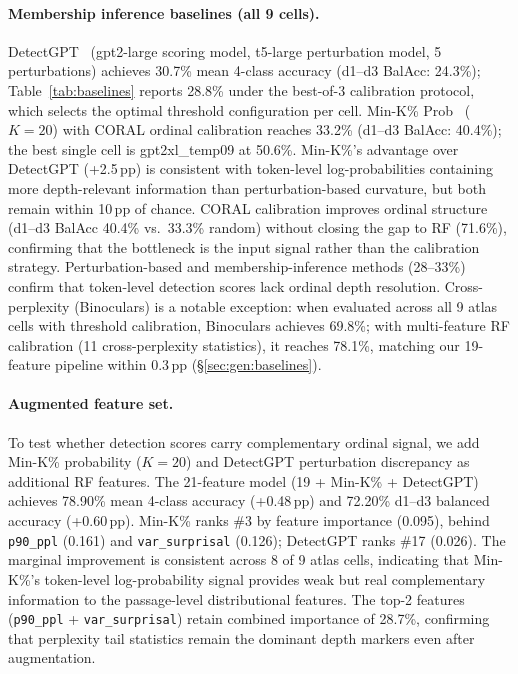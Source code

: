 \paragraph{Membership inference baselines (all 9 cells).}
DetectGPT~\cite{mitchell2023_detectgpt} (gpt2-large scoring model, t5-large perturbation model, 5 perturbations) achieves 30.7\% mean 4-class accuracy (d1--d3 BalAcc: 24.3\%); Table~\ref{tab:baselines} reports 28.8\% under the best-of-3 calibration protocol, which selects the optimal threshold configuration per cell.
Min-K\% Prob~\cite{shi2024_minkprob} ($K{=}20$) with CORAL ordinal calibration reaches 33.2\% (d1--d3 BalAcc: 40.4\%); the best single cell is gpt2xl\_temp09 at 50.6\%.
Min-K\%'s advantage over DetectGPT (+2.5\,pp) is consistent with token-level log-probabilities containing more depth-relevant information than perturbation-based curvature, but both remain within 10\,pp of chance.
CORAL calibration improves ordinal structure (d1--d3 BalAcc 40.4\% vs.\ 33.3\% random) without closing the gap to RF (71.6\%), confirming that the bottleneck is the input signal rather than the calibration strategy.
Perturbation-based and membership-inference methods (28--33\%) confirm that token-level detection scores lack ordinal depth resolution.
Cross-perplexity (Binoculars) is a notable exception: when evaluated across all 9 atlas cells with threshold calibration, Binoculars achieves 69.8\%; with multi-feature RF calibration (11 cross-perplexity statistics), it reaches 78.1\%, matching our 19-feature pipeline within 0.3\,pp (\S\ref{sec:gen:baselines}).

\paragraph{Augmented feature set.}
To test whether detection scores carry complementary ordinal signal, we add Min-K\% probability ($K{=}20$) and DetectGPT perturbation discrepancy as additional RF features.
The 21-feature model (19 + Min-K\% + DetectGPT) achieves 78.90\% mean 4-class accuracy (+0.48\,pp) and 72.20\% d1--d3 balanced accuracy (+0.60\,pp).
Min-K\% ranks \#3 by feature importance (0.095), behind \texttt{p90\_ppl} (0.161) and \texttt{var\_surprisal} (0.126); DetectGPT ranks \#17 (0.026).
The marginal improvement is consistent across 8 of 9 atlas cells, indicating that Min-K\%'s token-level log-probability signal provides weak but real complementary information to the passage-level distributional features.
The top-2 features (\texttt{p90\_ppl} + \texttt{var\_surprisal}) retain combined importance of 28.7\%, confirming that perplexity tail statistics remain the dominant depth markers even after augmentation.

